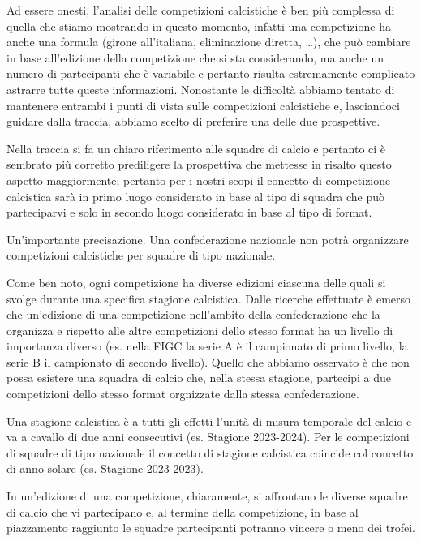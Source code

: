 Ad essere onesti, l'analisi delle competizioni calcistiche è ben più complessa di quella
che stiamo mostrando in questo momento, infatti una competizione ha anche una formula
(girone all'italiana, eliminazione diretta, \dots),
che può cambiare in base all'edizione della competizione che si sta considerando,
ma anche un numero di partecipanti che è variabile e pertanto risulta estremamente
complicato astrarre tutte queste informazioni.
Nonostante le difficoltà abbiamo tentato di mantenere entrambi i punti di vista sulle
competizioni calcistiche e, lasciandoci guidare dalla traccia, abbiamo scelto di preferire una
delle due prospettive.

Nella traccia si fa un chiaro riferimento alle squadre di calcio e pertanto ci è sembrato
più corretto prediligere la prospettiva che mettesse in risalto questo aspetto maggiormente;
pertanto per i nostri scopi il concetto di competizione calcistica sarà in primo luogo
considerato in base al tipo di squadra che può parteciparvi e solo in secondo luogo
considerato in base al tipo di format.

Un'importante precisazione. Una confederazione nazionale non potrà organizzare competizioni
calcistiche per squadre di tipo nazionale.

\bigskip
\bigskip

Come ben noto, ogni competizione ha diverse edizioni ciascuna delle quali si svolge durante
una specifica stagione calcistica.
Dalle ricerche effettuate è emerso che un'edizione di una competizione nell'ambito della
confederazione che la organizza e rispetto alle altre competizioni dello stesso format
ha un livello di importanza diverso (es. nella FIGC la serie A è il campionato di primo
livello, la serie B il campionato di secondo livello).
Quello che abbiamo osservato è che non possa esistere una squadra di calcio che, nella
stessa stagione, partecipi a due competizioni dello stesso format orgnizzate dalla stessa
confederazione.

Una stagione calcistica è a tutti gli effetti l'unità di misura temporale del calcio
e va a cavallo di due anni consecutivi (es. Stagione 2023-2024).
Per le competizioni di squadre di tipo nazionale il concetto di stagione calcistica
coincide col concetto di anno solare (es. Stagione 2023-2023).

In un'edizione di una competizione, chiaramente, si affrontano le diverse squadre di calcio
che vi partecipano e, al termine della competizione, in base al piazzamento raggiunto le
squadre partecipanti potranno vincere o meno dei trofei.

